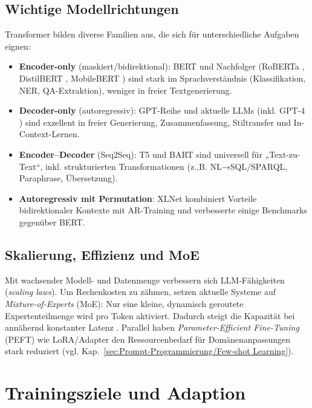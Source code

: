 \subsection{Wichtige Modellrichtungen}
Transformer bilden diverse Familien aus, die sich für unterschiedliche Aufgaben eignen:
\begin{itemize}
\item \textbf{Encoder-only} (maskiert/bidirektional): BERT \cite{devlin2019bert} und Nachfolger (RoBERTa \cite{liu2019roberta}, DistilBERT \cite{sanh2019distilbert}, MobileBERT \cite{sun2020mobilebert}) sind stark im Sprachverständnis (Klassifikation, NER, QA-Extraktion), weniger in freier Textgenerierung.
\item \textbf{Decoder-only} (autoregressiv): GPT-Reihe \cite{brown2020language} und aktuelle LLMs (inkl. GPT-4 \cite{openai2023gpt4}) sind exzellent in freier Generierung, Zusammenfassung, Stiltransfer und In-Context-Lernen.
\item \textbf{Encoder–Decoder} (Seq2Seq): T5 \cite{raffel2020t5} und BART \cite{lewis2020bart} sind universell für „Text-zu-Text“, inkl. strukturierten Transformationen (z.,B. NL→SQL/SPARQL, Paraphrase, Übersetzung).
\item \textbf{Autoregressiv mit Permutation}: XLNet \cite{yang2019xlnet} kombiniert Vorteile bidirektionaler Kontexte mit AR-Training und verbesserte einige Benchmarks gegenüber BERT.
\end{itemize}

\subsection{Skalierung, Effizienz und MoE}
Mit wachsender Modell- und Datenmenge verbessern sich LLM-Fähigkeiten (\emph{scaling laws}). Um Rechenkosten zu zähmen, setzen aktuelle Systeme auf \emph{Mixture-of-Experts} (MoE): Nur eine kleine, dynamisch geroutete Expertenteilmenge wird pro Token aktiviert. Dadurch steigt die Kapazität bei annähernd konstanter Latenz \cite{lepikhin2020gshard,fedus2021switch,du2022glam,rajbhandari2022deepspeedmoe}. Parallel haben \emph{Parameter-Efficient Fine-Tuning} (PEFT) wie LoRA/Adapter den Ressourcenbedarf für Domänenanpassungen stark reduziert (vgl. Kap.~\ref{sec:Prompt-Programmierung/Few-shot Learning}).

\section{Trainingsziele und Adaption}
\label{sec:Trainingsziele-Adaptionswege}

